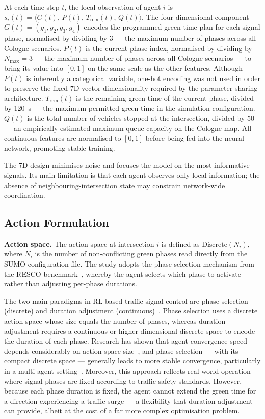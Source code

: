 At each time step $t$, the local observation of agent $i$ is
$s_i(t) = \langle G(t),\, P(t),\, T_\mathrm{rem}(t),\, Q(t) \rangle$.
The four-dimensional component $G(t) = (g_1, g_2, g_3, g_4)$ encodes the
programmed green-time plan for each signal phase, normalised by dividing by
$3$ — the maximum number of phases across all Cologne scenarios.
$P(t)$ is the current phase index, normalised by dividing by $N_\mathrm{max} = 3$ — the maximum number of phases across all Cologne scenarios — to bring its value into $[0, 1]$ on the same scale as the other features. Although $P(t)$ is inherently a categorical variable, one-hot encoding was not used in order to preserve the fixed 7D vector dimensionality required by the parameter-sharing architecture. $T_\mathrm{rem}(t)$ is the remaining green time of
the current phase, divided by 120~s — the maximum permitted green time in the
simulation configuration. $Q(t)$ is the total number of vehicles stopped at
the intersection, divided by 50 — an empirically estimated maximum queue
capacity on the Cologne map. All continuous features are normalised to
$[0, 1]$ before being fed into the neural network, promoting stable training.

The 7D design minimises noise and focuses the model on the most informative
signals. Its main limitation is that each agent observes only local
information; the absence of neighbouring-intersection state may constrain
network-wide coordination.

\subsection{Action Formulation}

\noindent\textbf{Action space.}\;
The action space at intersection $i$ is defined as
$\mathrm{Discrete}(N_i)$, where $N_i$ is the number of non-conflicting green
phases read directly from the SUMO configuration file. The study adopts the
phase-selection mechanism from the RESCO benchmark~\cite{ault2021resco},
whereby the agent selects which phase to activate rather than adjusting
per-phase durations.

The two main paradigms in RL-based traffic signal control are phase selection
(discrete) and duration adjustment (continuous)~\cite{tan2021hybrid}. Phase
selection uses a discrete action space whose size equals the number of phases,
whereas duration adjustment requires a continuous or higher-dimensional
discrete space to encode the duration of each phase. Research has shown that
agent convergence speed depends considerably on action-space size~\cite{tan2021hybrid},
and phase selection — with its compact discrete space — generally leads to more
stable convergence, particularly in a multi-agent setting~\cite{ault2021resco}.
Moreover, this approach reflects real-world operation where signal phases are
fixed according to traffic-safety standards. However, because each phase
duration is fixed, the agent cannot extend the green time for a direction
experiencing a traffic surge — a flexibility that duration adjustment can
provide, albeit at the cost of a far more complex optimisation problem.

